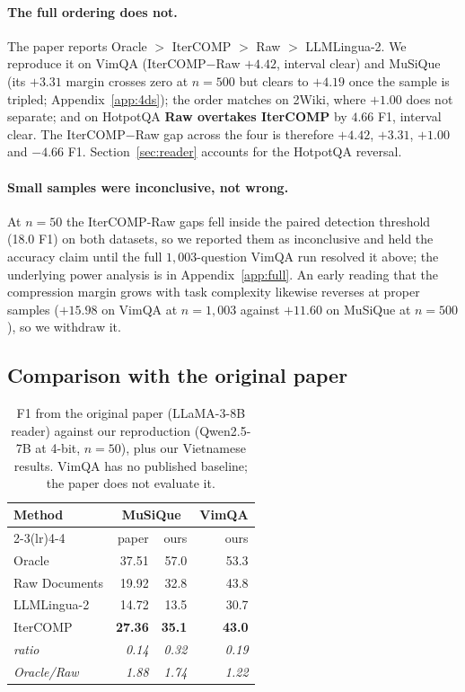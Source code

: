 \documentclass[11pt]{article}
\begin{document}
\paragraph{The full ordering does not.} The paper reports Oracle $>$ IterCOMP $>$
Raw $>$ LLMLingua-2. We reproduce it on VimQA (IterCOMP$-$Raw $+4.42$, interval
clear) and MuSiQue (its $+3.31$ margin crosses zero at $n=500$ but clears to
$+4.19$ once the sample is tripled; Appendix~\ref{app:4ds}); the order matches on
2Wiki, where $+1.00$ does not separate; and on HotpotQA \textbf{Raw overtakes
IterCOMP} by $4.66$ F1, interval clear. The IterCOMP$-$Raw gap across the four is
therefore $+4.42$, $+3.31$, $+1.00$ and $-4.66$ F1. Section~\ref{sec:reader}
accounts for the HotpotQA reversal.

\paragraph{Small samples were inconclusive, not wrong.} At $n=50$ the
IterCOMP-Raw gaps fell inside the paired detection threshold (18.0 F1) on both
datasets, so we reported them as inconclusive and held the accuracy claim until
the full $1{,}003$-question VimQA run resolved it above; the underlying power
analysis is in Appendix~\ref{app:full}. An early reading that the compression
margin grows with task complexity likewise reverses at proper samples ($+15.98$
on VimQA at $n=1{,}003$ against $+11.60$ on MuSiQue at $n=500$), so we withdraw
it.

\subsection{Comparison with the original paper}
\label{sec:vspaper}

\begin{table}[tbp]
\centering
\small
\begin{tabular}{lrrr}
\toprule
\multirow{2}{*}{Method} & \multicolumn{2}{c}{MuSiQue} & VimQA \\
\cmidrule(lr){2-3}\cmidrule(lr){4-4}
 & paper & ours & ours \\
\midrule
Oracle & 37.51 & 57.0 & 53.3 \\
Raw Documents & 19.92 & 32.8 & 43.8 \\
LLMLingua-2 & 14.72 & 13.5 & 30.7 \\
IterCOMP & \textbf{27.36} & \textbf{35.1} & \textbf{43.0} \\
\midrule
\emph{ratio} & \emph{0.14} & \emph{0.32} & \emph{0.19} \\
\emph{Oracle/Raw} & \emph{1.88} & \emph{1.74} & \emph{1.22} \\
\bottomrule
\end{tabular}
\caption{F1 from the original paper (LLaMA-3-8B reader) against our
reproduction (Qwen2.5-7B at 4-bit, $n=50$), plus our Vietnamese results.
VimQA has no published baseline; the paper does not evaluate it.}
\label{tab:vspaper}
\end{table}
\end{document}
